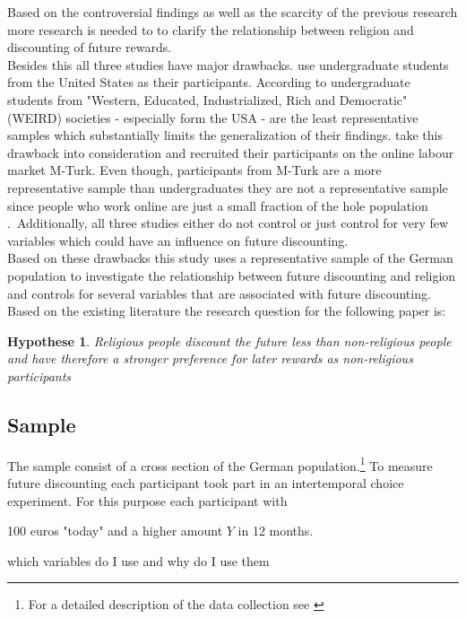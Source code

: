 \documentclass[12pt,a4paper]{article}
\newtheorem{hyp}{Hypothese}
\begin{document}
Based on the controversial findings as well as the scarcity of the previous research more research is needed to to clarify the relationship between religion and discounting of future rewards.\\
Besides this all three studies have major drawbacks. \textcite{carter2012religious, benjamin2010religious} use undergraduate students from the United States as their participants. According to \textcite{henrich2010weirdest} undergraduate students from "Western, Educated, Industrialized, Rich and Democratic" (WEIRD) societies - especially form the USA - are the least representative samples which substantially limits the generalization of their findings. \textcite{thornton2015divine} take this drawback into consideration and recruited their participants on the online labour market M-Turk. Even though, participants from M-Turk are a more representative sample than undergraduates they are not a representative sample since people who work online are just a small fraction of the hole population \parencite{horton2011online}.\
Additionally, all three studies either do not control or just control for very few variables which could have an influence on future discounting.\\

Based on these drawbacks this study uses a representative sample of the German population to investigate the relationship between future discounting and religion and controls for several variables that are associated with future discounting.
Based on the existing literature the research question for the following paper is: 
\begin{hyp}
Religious people discount the future less than non-religious people and have therefore a stronger preference for later rewards as non-religious participants
\end{hyp}

\subsection{Sample} 
The sample consist of a cross section of the German population.\footnote{For a detailed description of the data collection see \textcite{dohmen2010risk}} To measure future discounting each participant took part in an intertemporal choice experiment. For this purpose each participant with 



100 euros "today" and a higher amount $Y$ in 12 months. 

which variables do I use and why do I use them 
\end{document}
